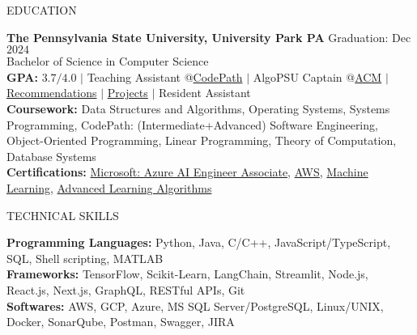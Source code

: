 \documentclass{resume} %
\begin{document}

\begin{rSection}{EDUCATION}

{\bf The Pennsylvania State University, University Park PA} \hfill {Graduation: Dec $2024$}\\
{Bachelor of Science in Computer Science}\\
{\bf GPA:} $3.7/4.0$ $\vert$ Teaching Assistant @\href{https://www.codepath.org/en-us/volunteers/technical-interview-coaching}{CodePath} $\vert$ AlgoPSU Captain @\href{https://acm.psu.edu/algopsu/}{ACM} $\vert$ \href{https://www.linkedin.com/in/harshitjain17/details/recommendations/}{Recommendations} $\vert$ \href{https://www.linkedin.com/in/harshitjain17/details/projects/}{Projects} $\vert$ Resident Assistant \\
{\bf Coursework:} Data Structures and Algorithms, Operating Systems, Systems Programming, CodePath: (Intermediate+Advanced) Software Engineering, Object-Oriented Programming, Linear Programming, Theory of Computation, Database Systems \\
{\bf Certifications:} \href{https://learn.microsoft.com/api/credentials/share/en-us/harshitjain17/36D25FDF9BE21293?sharingId=87F1F438F3879B8C}{Microsoft: Azure AI Engineer Associate}, \href{https://www.coursera.org/account/accomplishments/verify/7L8L8YQTMCPZ}{AWS}, \href{https://www.coursera.org/account/accomplishments/verify/JYX5UB5YP4YD}{Machine Learning}, \href{https://www.coursera.org/account/accomplishments/records/PBF4QN2KQL4Z}{Advanced Learning Algorithms}
\end{rSection}


\begin{rSection}{TECHNICAL SKILLS}

{\bf Programming Languages:} Python, Java, C/C++, JavaScript/TypeScript, SQL, Shell scripting, MATLAB\\
{\bf Frameworks:} TensorFlow, Scikit-Learn, LangChain, Streamlit, Node.js, React.js, Next.js, GraphQL, RESTful APIs, Git\\
{\bf Softwares:} AWS, GCP, Azure, MS SQL Server/PostgreSQL, Linux/UNIX, Docker, SonarQube, Postman, Swagger, JIRA

\end{rSection}
\end{document}
